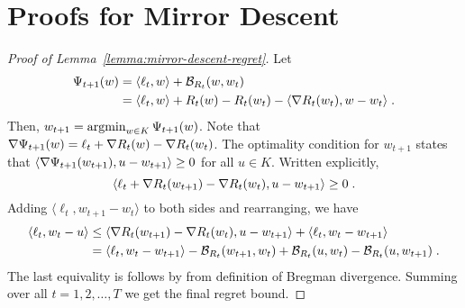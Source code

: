 \section{Proofs for Mirror Descent}
\label{section:mirror-descent-proofs}

\begin{proof}[Proof of Lemma~\ref{lemma:mirror-descent-regret}]
Let
\begin{align*}
\Psi_{t+1}(w)
& = \langle \ell_t, w \rangle + \mathcal{B}_{R_t}(w,w_t) \\
& = \langle \ell_t, w \rangle + R_t(w) - R_t(w_t) - \langle \nabla R_t(w_t) , w - w_t \rangle \; .
\end{align*}
Then, $w_{t+1} = \operatorname*{argmin}_{w \in K} \Psi_{t+1}(w)$. Note that $\nabla \Psi_{t+1}(w) = \ell_t + \nabla R_t(w) - \nabla R_t(w_t)$. The optimality
condition for $w_{t+1}$ states that $\langle \nabla \Psi_{t+1}(w_{t+1}), u - w_{t+1} \rangle \ge 0$ for all $u \in K$. Written explicitly,
$$
\langle \ell_t + \nabla R_t(w_{t+1}) - \nabla R_t(w_t), u - w_{t+1} \rangle \ge 0 \; .
$$
Adding $\langle \ell_t, w_{t+1} - w_t \rangle$ to both sides and rearranging, we have
\begin{align*}
\langle \ell_t, w_t - u \rangle
& \le \langle \nabla R_t(w_{t+1}) - \nabla R_t(w_t), u - w_{t+1} \rangle  + \langle \ell_t, w_t - w_{t+1} \rangle \\
& = \langle \ell_t, w_t - w_{t+1} \rangle - \mathcal{B}_{R_t}(w_{t+1}, w_t) + \mathcal{B}_{R_t}(u,w_t) - \mathcal{B}_{R_t}(u, w_{t+1}) \; .
\end{align*}
The last equivality is follows by from definition of Bregman divergence.
Summing over all $t=1,2,\dots,T$ we get the final regret bound.
\end{proof}

